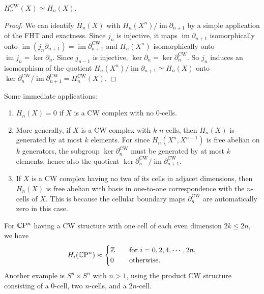 \begin{theorem}
    $H_n ^{\text{CW}}(X)\simeq H_n (X)$.
\end{theorem}
\begin{proof}
    We can identify $H_n (X)$ with $H_n (X^n ) / \operatorname{im}\partial _{n+1}$ by a simple application of the FHT and exactness. Since $j_n $ is injective, it maps $\operatorname{im}\partial _{n+1}$ isomorphically onto $\operatorname{im}(j_n \partial _{n+1})=\operatorname{im}\partial ^{\text{CW}}_{n+1}$ and $H_n (X^n )$ isomorphically onto $\operatorname{im}j_n =\ker \partial _n $. Since $j_{n-1}$ is injective, $\operatorname{ker}\partial _n =\operatorname{ker}\partial _n ^{\text{CW}}$. So $j_n $ induces an isomorphism of the quotient $H_n (X^n ) / \operatorname{im}\partial _{n+1}\simeq H_n (X)$ onto $\ker \partial _n ^{\text{CW}} / \operatorname{im}\partial _{n+1}^{\text{CW}}=H_n ^{\text{CW}}(X)$.
\end{proof}
Some immediate applications:
\begin{enumerate}[label=(\roman*)]
    \item $H_n (X)=0$ if $X$ is a CW complex with no $0$-cells.
    \item More generally, if $X$ is a CW complex with $k$ $n$-cells, then $H_n (X)$ is generated by at most $k$ elements. For since $H_n (X^n ,X^{n-1})$ is free abelian on $k$ generators, the subgroup  $\ker \partial _n ^{\text{CW}}$ must be generated by at most $k$ elements, hence also the quotient $\ker \partial _n ^{\text{CW}} / \operatorname{im}\partial _{n+1}^{\text{CW}}$.
    \item If $X$ is a CW complex having no two of its cells in adjacet dimensions, then $H_n (X)$ is free abelian with basis in one-to-one correspondence with the $n$-cells of $X$. This is because the cellular boundary maps $\partial _n ^{\text{CW}}$ are automatically zero in this case.
\end{enumerate}
\begin{example}
    For $\mathbb{C} \mathrm P^n $ having a CW structure with one cell of each even dimension $2k\leq 2n$, we have \[
        H_i (\mathbb{C}\mathrm P^n ) \approx 
        \begin{cases}
            \mathbb{Z} \quad& \text{for} \ i=0,2,4,\cdots ,2n,\\
            0 &\text{otherwise.}
        \end{cases}
    \] Another example is $S^n \times S^n $ with $n>1$, using the product CW structure consisting of a $0$-cell, two $n$-cells, and a $2n$-cell.
\end{example}
